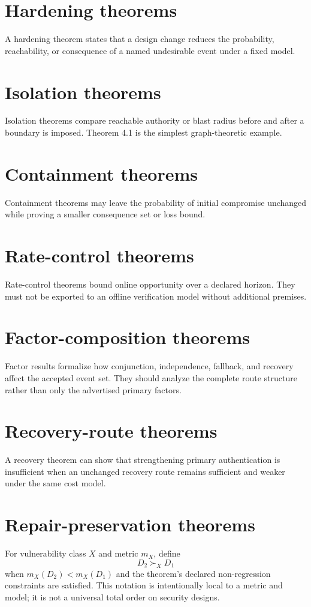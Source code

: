 \documentclass[11pt,oneside]{book}
\theoremstyle{definition}
\theoremstyle{remark}
\begin{document}
\section{Hardening theorems}
A hardening theorem states that a design change reduces the probability, reachability, or consequence of a named undesirable event under a fixed model.

\section{Isolation theorems}
Isolation theorems compare reachable authority or blast radius before and after a boundary is imposed. Theorem 4.1 is the simplest graph-theoretic example.

\section{Containment theorems}
Containment theorems may leave the probability of initial compromise unchanged while proving a smaller consequence set or loss bound.

\section{Rate-control theorems}
Rate-control theorems bound online opportunity over a declared horizon. They must not be exported to an offline verification model without additional premises.

\section{Factor-composition theorems}
Factor results formalize how conjunction, independence, fallback, and recovery affect the accepted event set. They should analyze the complete route structure rather than only the advertised primary factors.

\section{Recovery-route theorems}
A recovery theorem can show that strengthening primary authentication is insufficient when an unchanged recovery route remains sufficient and weaker under the same cost model.

\section{Repair-preservation theorems}
\label{sec:defense-dominance}
For vulnerability class $X$ and metric $m_X$, define
\[
D_2\succ_X D_1
\]
when $m_X(D_2)<m_X(D_1)$ and the theorem's declared non-regression constraints are satisfied. This notation is intentionally local to a metric and model; it is not a universal total order on security designs.
\end{document}
